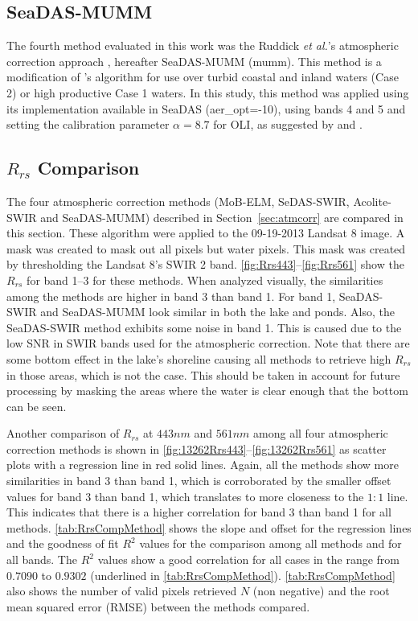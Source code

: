 \subsection{SeaDAS-MUMM}
The fourth method evaluated in this work was the Ruddick {\it et al.}'s atmospheric correction approach \cite{Ruddick:2000bs}, hereafter SeaDAS-MUMM (\acrfull{mumm}). This method is a modification of \cite{Gordon:1994}'s algorithm for use over turbid coastal and inland waters (Case 2) or high productive Case 1 waters. In this study, this method was applied using its implementation available in SeaDAS (aer\_opt=-10), using bands 4 and 5 and setting the calibration parameter $\alpha=8.7$ for OLI, as suggested by \cite{Vanhellemont2014} and \cite{Vanhellemont2014a}. 

\subsection{$R_{rs}$ Comparison}

 The four atmospheric correction methods (MoB-ELM, SeDAS-SWIR, Acolite-SWIR and SeaDAS-MUMM) described in Section~\ref{sec:atmcorr}  are compared in this section. These algorithm were applied to the 09-19-2013 Landsat 8 image. A mask was created to mask out all pixels but water pixels. This mask was created by thresholding the Landsat 8's SWIR 2 band. \autoref{fig:Rrs443}--\ref{fig:Rrs561} show the $R_{rs}$ for band 1--3 for these methods. When analyzed visually, the similarities among the methods are higher in band 3 than band 1. For band 1, SeaDAS-SWIR and SeaDAS-MUMM look similar in both the lake and ponds. Also, the SeaDAS-SWIR method exhibits some noise in band 1. This is caused due to the low SNR in SWIR bands used for the atmospheric correction. Note that there are some bottom effect in the lake's shoreline causing all methods to retrieve high $R_{rs}$ in those areas, which is not the case. This should be taken in account for future processing by masking the areas where the water is clear enough that the bottom can be seen.

Another comparison of $R_{rs}$ at $443nm$ and $561nm$ among all four atmospheric correction methods is shown in \autoref{fig:13262Rrs443}--\ref{fig:13262Rrs561} as scatter plots with a regression line in red solid lines. Again, all the methods show more similarities in band 3 than band 1, which is corroborated by the smaller offset values for band 3 than band 1, which translates to more closeness to the $1:1$ line. This indicates that there is a higher correlation for band 3 than band 1 for all methods. \autoref{tab:RrsCompMethod} shows the slope and offset for the regression lines and the goodness of fit $R^2$ values for the comparison among all methods and for all bands. The $R^2$ values show a good correlation for all cases in the range from $0.7090$ to $0.9302$ (underlined in \autoref{tab:RrsCompMethod}). \autoref{tab:RrsCompMethod} also shows the number of valid pixels retrieved $N$ (non negative) and the root mean squared error (RMSE) between the methods compared. 

